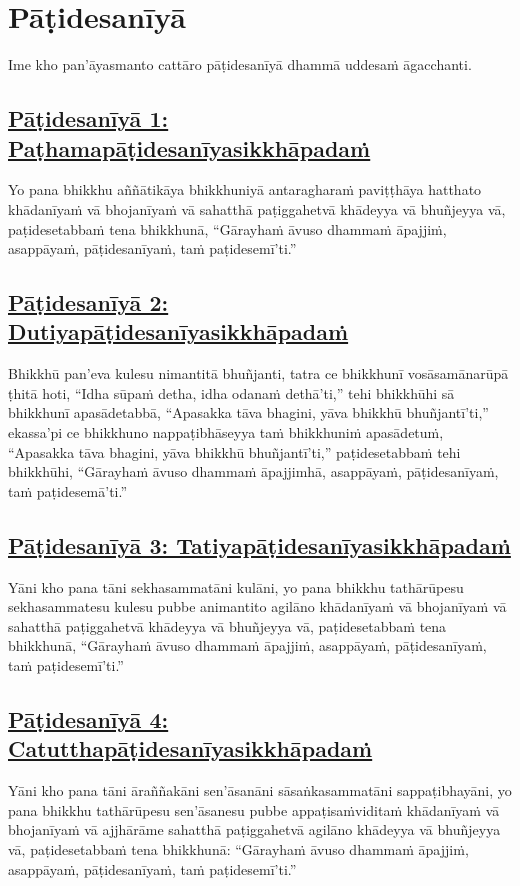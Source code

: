 \section{Pāṭidesanīyā}
\label{pd}

\begin{intro}
  Ime kho pan'āyasmanto cattāro pāṭidesanīyā dhammā uddesaṁ āgacchanti.
\end{intro}

\setsubsecheadstyle{\subsubsectionFmt}
\subsection*{\hyperref[ack1]{Pāṭidesanīyā 1: Paṭhamapāṭidesanīyasikkhāpadaṁ}}
\label{pd1}
Yo pana bhikkhu aññātikāya bhikkhuniyā antaragharaṁ paviṭṭhāya hatthato khādanīyaṁ vā bhojanīyaṁ vā sahatthā paṭiggahetvā khādeyya vā bhuñjeyya vā, paṭidesetabbaṁ tena bhikkhunā, ``Gārayhaṁ āvuso dhammaṁ āpajjiṁ, asappāyaṁ, pāṭidesanīyaṁ, taṁ paṭidesemī'ti.''

\subsection*{\hyperref[ack2]{Pāṭidesanīyā 2: Dutiyapāṭidesanīyasikkhāpadaṁ}}
\label{pd2}
Bhikkhū pan'eva kulesu nimantitā bhuñjanti, tatra ce bhikkhunī vosāsamānarūpā ṭhitā hoti, ``Idha sūpaṁ detha, idha odanaṁ dethā'ti,'' tehi bhikkhūhi sā bhikkhunī apasādetabbā, ``Apasakka tāva bhagini, yāva bhikkhū bhuñjantī'ti,'' ekassa'pi ce bhikkhuno nappaṭibhāseyya taṁ bhikkhuniṁ apasādetuṁ, ``Apasakka tāva bhagini, yāva bhikkhū bhuñjantī'ti,'' paṭidesetabbaṁ tehi bhikkhūhi, ``Gārayhaṁ āvuso dhammaṁ āpajjimhā, asappāyaṁ, pāṭidesanīyaṁ, taṁ paṭidesemā'ti.''

\subsection*{\hyperref[ack3]{Pāṭidesanīyā 3: Tatiyapāṭidesanīyasikkhāpadaṁ}}
\label{pd3}
Yāni kho pana tāni sekhasammatāni kulāni, yo pana bhikkhu tathārūpesu sekhasammatesu kulesu pubbe animantito agilāno khādanīyaṁ vā bhojanīyaṁ vā sahatthā paṭiggahetvā khādeyya vā bhuñjeyya vā, paṭidesetabbaṁ tena bhikkhunā, ``Gārayhaṁ āvuso dhammaṁ āpajjiṁ, asappāyaṁ, pāṭidesanīyaṁ, taṁ paṭidesemī'ti.''

\subsection*{\hyperref[ack4]{Pāṭidesanīyā 4: Catutthapāṭidesanīyasikkhāpadaṁ}}
\label{pd4}
Yāni kho pana tāni āraññakāni sen'āsanāni sāsaṅkasammatāni sappaṭibhayāni, yo pana bhikkhu tathārūpesu sen'āsanesu pubbe appaṭisaṁviditaṁ khādanīyaṁ vā bhojanīyaṁ vā ajjhārāme sahatthā paṭiggahetvā agilāno khādeyya vā bhuñjeyya vā, paṭidesetabbaṁ tena bhikkhunā: ``Gārayhaṁ āvuso dhammaṁ āpajjiṁ, asappāyaṁ, pāṭidesanīyaṁ, taṁ paṭidesemī'ti.''

